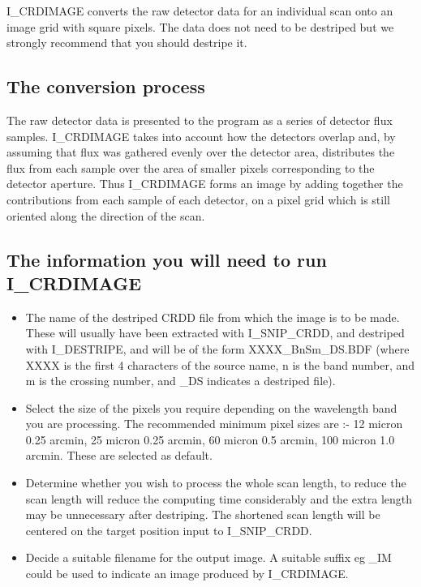 I\_CRDIMAGE  converts the raw detector data for an individual scan
onto an image grid with square pixels. The data does not need to be destriped
but we strongly recommend that you should destripe it.

\subsection{The conversion process}

The raw detector data is presented to the program as a series of detector flux 
samples. I\_CRDIMAGE takes into account how the detectors
overlap and, by assuming that flux was gathered evenly over the detector area,
distributes the flux from each sample over the area of smaller pixels
corresponding to the detector aperture. Thus I\_CRDIMAGE forms an image by 
adding together the contributions from each sample of each detector, on a pixel
grid which is still oriented along the direction of the scan.

\subsection{The information you will need to run I\_CRDIMAGE}

\begin{itemize}

\item The name of the destriped CRDD file from which the image is to be made.
These will usually have been extracted with I\_SNIP\_CRDD, and destriped with 
I\_DESTRIPE, and will be of the form XXXX\_BnSm\_DS.BDF (where XXXX 
is the first 4 characters of the source name, n is the band number, and m is 
the crossing number, and \_DS indicates a destriped file).

\item Select the size of the pixels you require depending
on the wavelength band you are processing. The recommended minimum pixel sizes
are :- 12 micron  0.25 arcmin, 25 micron  0.25 arcmin, 60 micron   0.5 arcmin,
100 micron  1.0 arcmin. These are selected as default.                                 

\item Determine whether you wish to process the whole scan length, to reduce
the scan length will reduce the computing time considerably and the extra
length may be unnecessary after destriping. The shortened scan length will be
centered on the target position input to I\_SNIP\_CRDD.

\item Decide a suitable filename for the output image. A suitable suffix eg \_IM
could be used to indicate an image produced by I\_CRDIMAGE.
\end {itemize}

